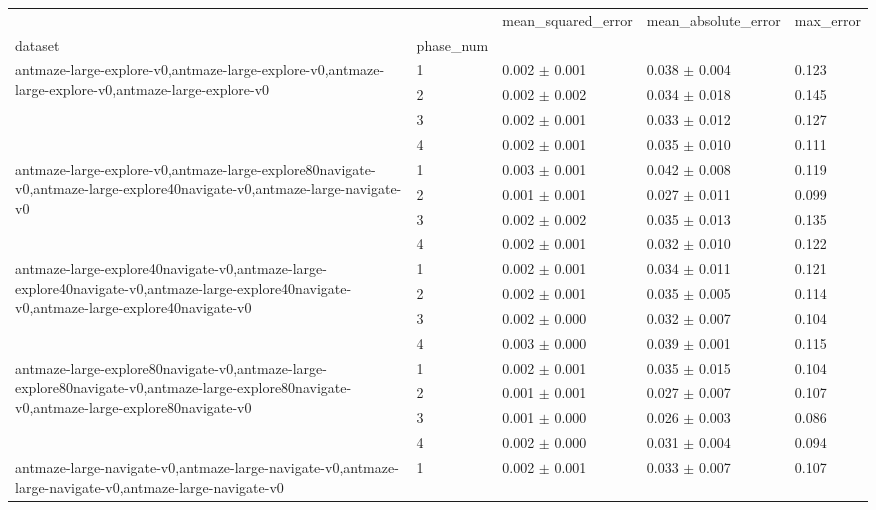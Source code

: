 \begin{tabular}{lllll}
\toprule
 &  & mean_squared_error & mean_absolute_error & max_error \\
dataset & phase_num &  &  &  \\
\midrule
\multirow[t]{4}{*}{antmaze-large-explore-v0,antmaze-large-explore-v0,antmaze-large-explore-v0,antmaze-large-explore-v0} & 1 & 0.002 $\pm$ 0.001 & 0.038 $\pm$ 0.004 & 0.123 \\
 & 2 & 0.002 $\pm$ 0.002 & 0.034 $\pm$ 0.018 & 0.145 \\
 & 3 & 0.002 $\pm$ 0.001 & 0.033 $\pm$ 0.012 & 0.127 \\
 & 4 & 0.002 $\pm$ 0.001 & 0.035 $\pm$ 0.010 & 0.111 \\
\cline{1-5}
\multirow[t]{4}{*}{antmaze-large-explore-v0,antmaze-large-explore80navigate-v0,antmaze-large-explore40navigate-v0,antmaze-large-navigate-v0} & 1 & 0.003 $\pm$ 0.001 & 0.042 $\pm$ 0.008 & 0.119 \\
 & 2 & 0.001 $\pm$ 0.001 & 0.027 $\pm$ 0.011 & 0.099 \\
 & 3 & 0.002 $\pm$ 0.002 & 0.035 $\pm$ 0.013 & 0.135 \\
 & 4 & 0.002 $\pm$ 0.001 & 0.032 $\pm$ 0.010 & 0.122 \\
\cline{1-5}
\multirow[t]{4}{*}{antmaze-large-explore40navigate-v0,antmaze-large-explore40navigate-v0,antmaze-large-explore40navigate-v0,antmaze-large-explore40navigate-v0} & 1 & 0.002 $\pm$ 0.001 & 0.034 $\pm$ 0.011 & 0.121 \\
 & 2 & 0.002 $\pm$ 0.001 & 0.035 $\pm$ 0.005 & 0.114 \\
 & 3 & 0.002 $\pm$ 0.000 & 0.032 $\pm$ 0.007 & 0.104 \\
 & 4 & 0.003 $\pm$ 0.000 & 0.039 $\pm$ 0.001 & 0.115 \\
\cline{1-5}
\multirow[t]{4}{*}{antmaze-large-explore80navigate-v0,antmaze-large-explore80navigate-v0,antmaze-large-explore80navigate-v0,antmaze-large-explore80navigate-v0} & 1 & 0.002 $\pm$ 0.001 & 0.035 $\pm$ 0.015 & 0.104 \\
 & 2 & 0.001 $\pm$ 0.001 & 0.027 $\pm$ 0.007 & 0.107 \\
 & 3 & 0.001 $\pm$ 0.000 & 0.026 $\pm$ 0.003 & 0.086 \\
 & 4 & 0.002 $\pm$ 0.000 & 0.031 $\pm$ 0.004 & 0.094 \\
\cline{1-5}
\multirow[t]{4}{*}{antmaze-large-navigate-v0,antmaze-large-navigate-v0,antmaze-large-navigate-v0,antmaze-large-navigate-v0} & 1 & 0.002 $\pm$ 0.001 & 0.033 $\pm$ 0.007 & 0.107 \\

\end{tabular}
